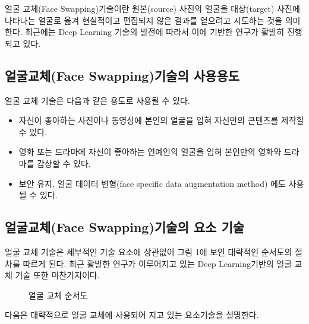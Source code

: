 얼굴 교체(Face Swapping)기술이란 원본(source) 사진의 얼굴을 대상(target) 사진에 나타나는 얼굴로 옮겨 현실적이고 편집되지 않은 결과를 얻으려고 시도하는 것을 의미한다. 최근에는 Deep Learning 기술의 발전에 따라서 이에 기반한 연구가 활발히 진행되고 있다.

\subsection{ 얼굴교체(Face Swapping)기술의 사용용도}

얼굴 교체 기술은 다음과 같은 용도로 사용될 수 있다.

\begin{itemize}
    \item 자신이 좋아하는 사진이나 동영상에 본인의 얼굴을 입혀 자신만의 콘텐츠를 제작할 수 있다.
    \item 영화 또는 드라마에 자신이 좋아하는 연예인의 얼굴을 입혀 본인만의 영화와 드라마를 감상할 수 있다.
    \item 보안 유지, 얼굴 데이터 변형(face specific data augmentation method) 에도 사용될 수 있다.
\end{itemize}

\subsection{ 얼굴교체(Face Swapping)기술의 요소 기술}

얼굴 교체 기술은 세부적인 기술 요소에 상관없이 그림 1에 보인 대략적인 순서도의 절차를 따르게 된다. 최근 활발한 연구가 이루어지고 있는 Deep Learning기반의 얼굴 교체 기술 또한 마찬가지이다. 

\begin{figure}[h!]
\centering
\caption{얼굴 교체 순서도}
\end{figure}

다음은 대략적으로 얼굴 교체에 사용되어 지고 있는 요소기술을 설명한다.

